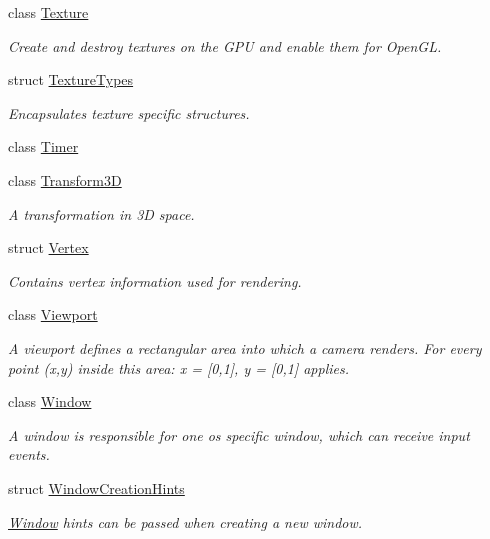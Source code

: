 \begin{DoxyCompactItemize}
\item 
class \mbox{\hyperlink{classec_1_1_texture}{Texture}}
\begin{DoxyCompactList}\small\item\em Create and destroy textures on the G\+PU and enable them for Open\+GL. \end{DoxyCompactList}\item 
struct \mbox{\hyperlink{structec_1_1_texture_types}{Texture\+Types}}
\begin{DoxyCompactList}\small\item\em Encapsulates texture specific structures. \end{DoxyCompactList}\item 
class \mbox{\hyperlink{classec_1_1_timer}{Timer}}
\item 
class \mbox{\hyperlink{classec_1_1_transform3_d}{Transform3D}}
\begin{DoxyCompactList}\small\item\em A transformation in 3D space. \end{DoxyCompactList}\item 
struct \mbox{\hyperlink{structec_1_1_vertex}{Vertex}}
\begin{DoxyCompactList}\small\item\em Contains vertex information used for rendering. \end{DoxyCompactList}\item 
class \mbox{\hyperlink{classec_1_1_viewport}{Viewport}}
\begin{DoxyCompactList}\small\item\em A viewport defines a rectangular area into which a camera renders. For every point (x,y) inside this area\+: x = \mbox{[}0,1\mbox{]}, y = \mbox{[}0,1\mbox{]} applies. \end{DoxyCompactList}\item 
class \mbox{\hyperlink{classec_1_1_window}{Window}}
\begin{DoxyCompactList}\small\item\em A window is responsible for one os specific window, which can receive input events. \end{DoxyCompactList}\item 
struct \mbox{\hyperlink{structec_1_1_window_creation_hints}{Window\+Creation\+Hints}}
\begin{DoxyCompactList}\small\item\em \mbox{\hyperlink{classec_1_1_window}{Window}} hints can be passed when creating a new window. \end{DoxyCompactList}\end{DoxyCompactItemize}
